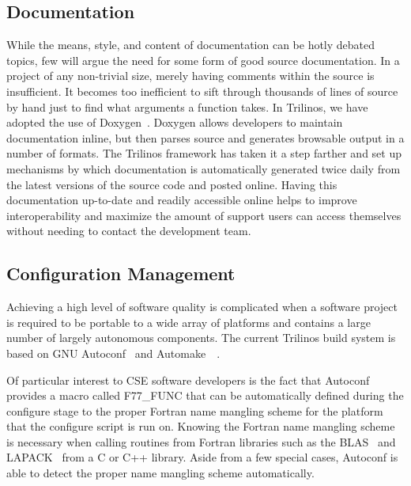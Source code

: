 \documentclass[12pt,relax]{article}
\begin{document}
\subsection{Documentation}


While the means, style, and content of documentation can be hotly debated
topics, few will argue the need for some form of good source documentation.
In a project of any non-trivial size, merely having comments within the source
is insufficient.  It becomes too inefficient to sift through thousands of lines
of source by hand just to find what arguments a function takes.  In Trilinos,
we have adopted the use of Doxygen~\cite{Doxygen}.  Doxygen allows developers
to maintain documentation inline, but then parses source and generates
browsable output in a number of formats.  The Trilinos framework has taken it a
step farther and set up mechanisms by which documentation is automatically
generated twice daily from the latest versions of the source code and posted
online.  Having this documentation up-to-date and readily accessible online
helps to improve interoperability and maximize the amount of support users can
access themselves without needing to contact the development team.

\subsection{Configuration Management}


Achieving a high level of software quality is complicated when
a software project is required to be portable to a wide array of platforms 
and contains a large number of largely autonomous components.
The current Trilinos build system is based on GNU Autoconf~\cite{Autoconf} and
Automake~\cite{Automake}~\cite{GoatBook}.

Of particular interest to CSE software developers is the fact that Autoconf
provides a macro called F77\_FUNC that can be
automatically defined during the configure stage to the proper Fortran
name mangling scheme for the platform that the configure script is run on.
Knowing the Fortran name mangling scheme is necessary when calling routines
from Fortran libraries such as the BLAS~\cite{BLAS1,BLAS2,BLAS3} and
LAPACK~\cite{lapack} from a C or C++ library.  Aside from a few special cases,
Autoconf is able to detect the proper name mangling scheme automatically.
\end{document}
